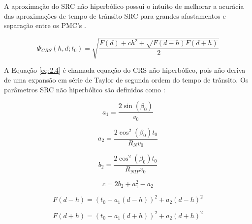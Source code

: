 A aproximação do SRC não hiperbólico possui o
intuito de melhorar a acurácia das aproximações de tempo de trânsito SRC
para grandes afastamentos e separação entre os PMC's \cite{fomel1}.

\begin{equation}
\label{eq:2.4}
 \Phi_{CRS}(h,d;t_0)=\sqrt{\frac{F(d)+ch^2+\sqrt{F(d-h)F(d+h)}}{2}}
\end{equation}

A Equação \ref{eq:2.4} é chamada equação do CRS não-hiperbólico, pois não deriva de uma expansão em série de Taylor
de segunda ordem do tempo de trânsito. Os parâmetros 
SRC não hiperbólico são definidos como \cite{fomel1}:

\begin{equation}
\label{eq:2.5}
 a_1=\frac{2\sin(\beta_0)}{v_0}
\end{equation}

\begin{equation}
\label{eq:2.6}
 a_2=\frac{2\cos^2(\beta_0)t_0}{R_Nv_0}
\end{equation}

\begin{equation}
\label{eq:2.7}
 b_2=\frac{2\cos^2(\beta_0)t_0}{R_{NIP}v_0}
\end{equation}

\begin{equation}
\label{eq:2.8}
 c=2b_2+a_1^2-a_2
\end{equation}

\begin{equation}
\label{eq:2.9}
 F(d-h)=(t_0+a_1(d-h))^2+a_2(d-h)^2
\end{equation}

\begin{equation}
\label{eq:2.10}
 F(d+h)=(t_0+a_1(d+h))^2+a_2(d+h)^2
\end{equation}
